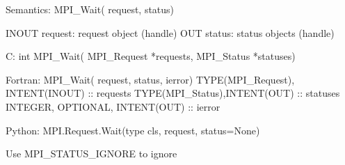 Semantics:
MPI_Wait( request, status)

INOUT request: request object (handle)
OUT status: status objects (handle)

C:
int MPI_Wait(
    MPI_Request *requests,
    MPI_Status *statuses)

Fortran:
MPI_Wait( request, status, ierror)
TYPE(MPI_Request), INTENT(INOUT) :: requests
TYPE(MPI_Status),INTENT(OUT) :: statuses
INTEGER, OPTIONAL, INTENT(OUT) :: ierror

Python:
MPI.Request.Wait(type cls, request, status=None)

Use MPI_STATUS_IGNORE to ignore
